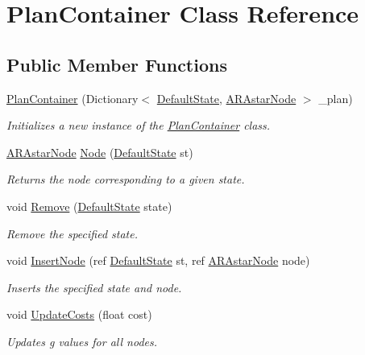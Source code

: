 \hypertarget{class_plan_container}{\section{Plan\-Container Class Reference}
\label{class_plan_container}
}
\subsection*{Public Member Functions}
\begin{DoxyCompactItemize}
\item 
\hyperlink{class_plan_container_af4eac8ba49af8845098657fbce70bd5c}{Plan\-Container} (Dictionary$<$ \hyperlink{class_default_state}{Default\-State}, \hyperlink{class_a_r_astar_node}{A\-R\-Astar\-Node} $>$ \-\_\-plan)
\begin{DoxyCompactList}\small\item\em Initializes a new instance of the \hyperlink{class_plan_container}{Plan\-Container} class. \end{DoxyCompactList}\item 
\hyperlink{class_a_r_astar_node}{A\-R\-Astar\-Node} \hyperlink{class_plan_container_a1c5b054eddfff18de7d02631a4babdfd}{Node} (\hyperlink{class_default_state}{Default\-State} st)
\begin{DoxyCompactList}\small\item\em Returns the node corresponding to a given state. \end{DoxyCompactList}\item 
void \hyperlink{class_plan_container_a7fd7f8b92671e2a0f64d2bde1b508809}{Remove} (\hyperlink{class_default_state}{Default\-State} state)
\begin{DoxyCompactList}\small\item\em Remove the specified state. \end{DoxyCompactList}\item 
void \hyperlink{class_plan_container_a055275bf8a2330996670c669ec23f89f}{Insert\-Node} (ref \hyperlink{class_default_state}{Default\-State} st, ref \hyperlink{class_a_r_astar_node}{A\-R\-Astar\-Node} node)
\begin{DoxyCompactList}\small\item\em Inserts the specified state and node. \end{DoxyCompactList}\item 
void \hyperlink{class_plan_container_a91e41d4fd5a34c3cf958f0940dfb8d10}{Update\-Costs} (float cost)
\begin{DoxyCompactList}\small\item\em Updates g values for all nodes. \end{DoxyCompactList}\item 

\end{DoxyCompactItemize}
